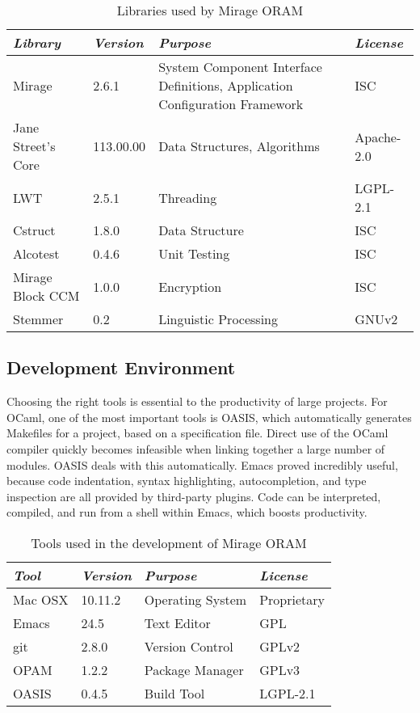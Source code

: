 \documentclass[12pt,a4paper,twoside,openright]{report}
\begin{document}
\begin{table}[h]
\centering
\begin{tabularx}{\textwidth}{|l|l|X|l|}
\hline
\textit{Library} & \textit{Version} & \textit{Purpose} & \textit{License} \\
\hline \hline
Mirage & 2.6.1 & System Component Interface Definitions, Application Configuration Framework & ISC \\
\hline
Jane Street's Core & 113.00.00 & Data Structures, Algorithms & Apache-2.0 \\
\hline
LWT & 2.5.1 & Threading & LGPL-2.1 \\
\hline
Cstruct & 1.8.0 & Data Structure & ISC \\
\hline
Alcotest & 0.4.6 & Unit Testing & ISC \\
\hline
Mirage Block CCM & 1.0.0 & Encryption & ISC \\
\hline
Stemmer & 0.2 & Linguistic Processing & GNUv2 \\
\hline
\end{tabularx}
\caption{Libraries used by Mirage ORAM}
\label{tab:libraries}
\end{table}

\subsection{Development Environment}

Choosing the right tools is essential to the productivity of large projects. For OCaml, one of the most important tools is OASIS, which automatically generates Makefiles for a project, based on a specification file. Direct use of the OCaml compiler quickly becomes infeasible when linking together a large number of modules. OASIS deals with this automatically.
Emacs proved incredibly useful, because code indentation, syntax highlighting, autocompletion, and type inspection are all provided by third-party plugins. Code can be interpreted, compiled, and run from a shell within Emacs, which boosts productivity.

\begin{table}[t]
    \centering
    \begin{tabular}{|l|l|l|l|}
      \hline
      \textit{Tool} & \textit{Version} & \textit{Purpose} & \textit{License} \\
      \hline \hline
      Mac OSX & 10.11.2 & Operating System & Proprietary \\
      \hline
      Emacs & 24.5 & Text Editor & GPL \\
      \hline
      git & 2.8.0 & Version Control & GPLv2 \\
      \hline
      OPAM & 1.2.2 & Package Manager & GPLv3 \\
      \hline
      OASIS & 0.4.5 & Build Tool & LGPL-2.1 \\
      \hline
    \end{tabular}
    \caption{Tools used in the development of Mirage ORAM}
    \label{tab:devtools}
\end{table}
\end{document}
